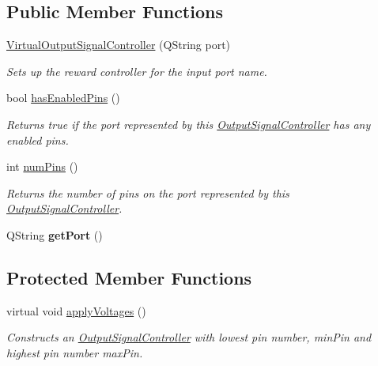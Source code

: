 \subsection*{Public Member Functions}
\begin{DoxyCompactItemize}
\item 
\hyperlink{class_picto_1_1_virtual_output_signal_controller_a08694df6722f87e2220f6b7756c225b1}{Virtual\-Output\-Signal\-Controller} (Q\-String port)
\begin{DoxyCompactList}\small\item\em Sets up the reward controller for the input port name. \end{DoxyCompactList}\item 
\hypertarget{class_picto_1_1_virtual_output_signal_controller_a1bedddba727be4a0814dbb4b1ff8b762}{bool \hyperlink{class_picto_1_1_virtual_output_signal_controller_a1bedddba727be4a0814dbb4b1ff8b762}{has\-Enabled\-Pins} ()}\label{class_picto_1_1_virtual_output_signal_controller_a1bedddba727be4a0814dbb4b1ff8b762}

\begin{DoxyCompactList}\small\item\em Returns true if the port represented by this \hyperlink{class_picto_1_1_output_signal_controller}{Output\-Signal\-Controller} has any enabled pins. \end{DoxyCompactList}\item 
int \hyperlink{class_picto_1_1_virtual_output_signal_controller_adbc819a869db5cdb7874741042fc0145}{num\-Pins} ()
\begin{DoxyCompactList}\small\item\em Returns the number of pins on the port represented by this \hyperlink{class_picto_1_1_output_signal_controller}{Output\-Signal\-Controller}. \end{DoxyCompactList}\item 
\hypertarget{class_picto_1_1_virtual_output_signal_controller_ad9464e1aab2a1010b78a17267a57d9bf}{Q\-String {\bfseries get\-Port} ()}\label{class_picto_1_1_virtual_output_signal_controller_ad9464e1aab2a1010b78a17267a57d9bf}

\end{DoxyCompactItemize}
\subsection*{Protected Member Functions}
\begin{DoxyCompactItemize}
\item 
virtual void \hyperlink{class_picto_1_1_virtual_output_signal_controller_a600d9422146df4d794cceebeacfcc3aa}{apply\-Voltages} ()
\begin{DoxyCompactList}\small\item\em Constructs an \hyperlink{class_picto_1_1_output_signal_controller}{Output\-Signal\-Controller} with lowest pin number, min\-Pin and highest pin number max\-Pin. \end{DoxyCompactList}\end{DoxyCompactItemize}
